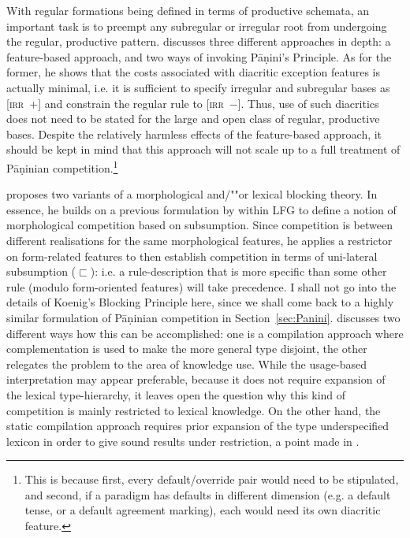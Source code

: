 \documentclass[output=paper
	        ,collection
	        ,collectionchapter
 	        ,biblatex
                ,babelshorthands
                ,newtxmath
                ,draftmode
                ,colorlinks, citecolor=brown
]{./langsci/langscibook}
\begin{document}
{With regular formations being defined in terms of productive schemata,
an important task is to preempt any subregular or irregular root from
undergoing the regular, productive pattern. \citet{Koenig99} discusses
three different approaches in depth: a feature-based approach, and two
ways of invoking Pāṇini's Principle. As for the former, he shows that
the costs associated with diacritic exception features is actually
minimal, i.e. it is sufficient to specify irregular and subregular
bases as \textsc{[irr~$+$]} and constrain the regular rule to
\textsc{[irr~$-$]}. Thus, use of such diacritics does not need to be
stated for the large and open class of regular, productive
bases. Despite the relatively harmless effects of the feature-based
approach, it should be kept in mind that this approach will not scale
up to a full treatment of Pāṇinian competition.\footnote{This is
  because first, every default/override pair would need to be
  stipulated, and second, if a paradigm has defaults in different
  dimension (e.g. a default tense, or a default agreement marking),
  each would need its own diacritic feature.}

\citet{Koenig99} proposes two variants of a morphological and/""or lexical blocking
theory. In essence, he builds on a previous formulation by
\citet{Andrews90} within LFG to define a notion of morphological
competition based on subsumption. Since competition is between
different realisations for the same morphological features, he applies
a restrictor on form-related features to then establish competition in
terms of uni-lateral subsumption ($\sqsubset$): i.e. a
rule-description that is more specific than some other rule (modulo
form-oriented features) will take precedence. I shall not go into the
details of Koenig's Blocking Principle here, since we shall come back
to a highly similar formulation of Pāṇinian competition in
Section~\ref{sec:Panini}.  \citet{Koenig99} discusses two different
ways how this can be accomplished: one is a compilation approach where
complementation is used to make the more general type disjoint, the
other relegates the problem to the area of knowledge use. While the
usage-based interpretation may appear preferable, because it does not
require expansion of the lexical type-hierarchy, it leaves open the
question why this kind of competition is mainly restricted to lexical
knowledge. On the other hand, the static compilation approach requires
prior expansion of the type underspecified lexicon in order to give
sound results under restriction, a point made in
\citet{crysmann_b03book}.

}
\end{document}
